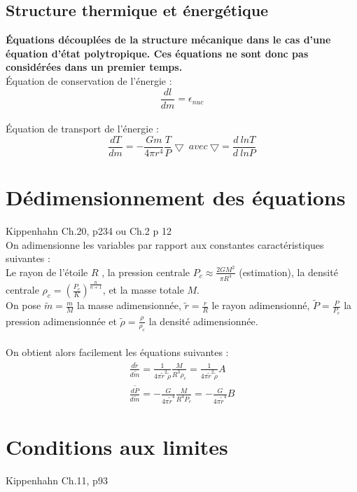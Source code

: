 \documentclass[a4paper,10pt]{article}
\begin{document}
\subsection{Structure thermique et énergétique}
\textbf{Équations découplées de la structure mécanique dans le cas d'une équation d'état polytropique. Ces équations ne sont donc pas considérées dans un premier temps.}\\
Équation de conservation de l'énergie :
\begin{equation}
\frac{d l}{d m}= \epsilon_{nuc}
\end{equation}
\\
Équation de transport de l'énergie :
\begin{equation}
\frac{d T}{d m}= - \frac{G m}{4 \pi r^4} \frac{T}{P} \bigtriangledown ~ avec ~ \bigtriangledown = \frac{d~ln T}{d~ln P}
\end{equation}

\newpage

\section{Dédimensionnement des équations}
Kippenhahn Ch.20, p234 ou Ch.2 p 12\\
On adimensionne les variables par rapport aux constantes caractéristiques suivantes :\\
Le rayon de l'étoile $R$ , la pression centrale $P_c \approx \frac{2 G M^2}{\pi R^4}$ (estimation), la densité centrale $\rho_c =(\frac{P_c}{K})^{\frac{n}{n+1}}$, et la masse totale $M$. \\
On pose $\tilde{m}=\frac{m}{M}$ la masse adimensionnée, $\tilde{r}=\frac{r}{R}$ le rayon adimensionné, $\tilde{P}=\frac{P}{P_c}$ la pression adimensionnée et $\tilde{\rho}=\frac{\rho}{\rho_c}$ la densité adimensionnée. \\
\\
On obtient alors facilement les équations suivantes :
\begin{eqnarray}
\frac{d \tilde{r}}{d \tilde{m}}=\frac{1}{4 \pi \tilde{r}^2 \tilde{\rho}} \frac{M}{R^3 \rho_c} =\frac{1}{4 \pi \tilde{r}^2 \tilde{\rho}} A\\
\frac{d \tilde{P}}{d \tilde{m}}=-\frac{G}{4 \pi \tilde{r}^4} \frac{M}{R^4 P_c} =-\frac{G}{4 \pi \tilde{r}^4} B
\end{eqnarray}


\section{Conditions aux limites}
Kippenhahn Ch.11, p93
\end{document}
